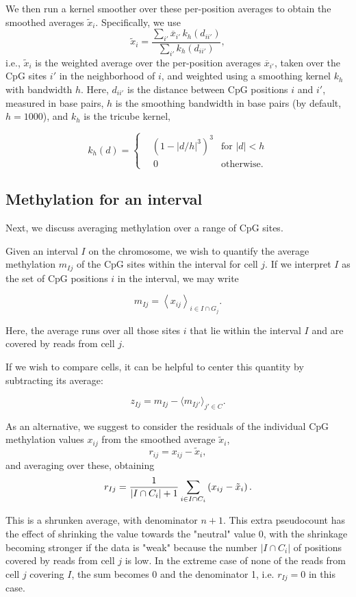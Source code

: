\documentclass[twocolumn,10pt]{article}
\begin{document}
We then run a kernel smoother over these per-position averages to obtain the smoothed averages $\tilde x_i$. Specifically, we use
\[ \tilde x_i = \frac{\sum_{i'} \overline x_{i'}\, k_h(d_{ii'})}{\sum_{i'} k_h(d_{ii'})},\]
i.e., $\tilde x_i$ is the weighted average over the per-position averages $\overline{x}_{i'}$, taken over the CpG sites $i'$ in the neighborhood of $i$, and weighted using a smoothing kernel $k_h$ with bandwidth $h$. Here, $d_{ii'}$ is the distance between CpG positions $i$ and $i'$, measured in base pairs, $h$ is the smoothing bandwidth in base pairs (by default, $h=1000$), and $k_h$ is the tricube kernel,

\[ k_h(d) = \left\{
\begin{aligned}
    &\left(1-|d/h|^3\right)^3 &\text{for } |d|<h \\
    &\,0 &\text{otherwise}. 
\end{aligned}
\right.
\]

\subsection{Methylation for an interval}

Next, we discuss averaging methylation over a range of CpG sites.

Given an interval $I$ on the chromosome, we wish to quantify the average methylation $m_{Ij}$ of the CpG sites within the interval for cell $j$. If we interpret $I$ as the set of CpG positions $i$ in the interval, we may write

$$ m_{Ij} = \left< x_{ij} \right>_{i\in I\cap G_j}.$$

Here, the average runs over all those sites $i$ that lie within the interval $I$ and are covered by reads from cell $j$.

If we wish to compare cells, it can be helpful to center this quantity by subtracting its average:

$$ z_{Ij} = m_{Ij} - \langle m_{Ij'}\rangle_{j'\in C}.$$

As an alternative, we suggest to consider the residuals of the individual CpG methylation values $x_{ij}$ from the smoothed average $\tilde x_i$,
$$ r_{ij} = x_{ij} - \tilde x_i, $$
and averaging over these, obtaining
\begin{equation} 
r_{Ij} = \frac{\scriptsize{1}}{\scriptsize{|I\cap C_i|+1}}\sum_{i\in I\cap C_i}\left( x_{ij} - \tilde x_i \right). \label{avgres}
\end{equation}

This is a shrunken average, with denominator $n+1$. This extra pseudocount has the effect of shrinking the value towards the "neutral" value 0, with the shrinkage becoming stronger if the data is "weak" because the number $|I\cap C_i|$ of positions covered by reads from cell $j$  is low. In the extreme case of none of the reads from cell $j$ covering $I$, the sum becomes 0 and the denominator 1, i.e. $r_{Ij}=0$ in this case.
\end{document}
